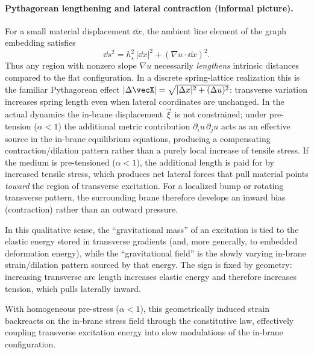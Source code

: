 \paragraph{Pythagorean lengthening and lateral contraction (informal picture).}
For a small material displacement $\dd x$, the ambient line element of the graph embedding satisfies
\begin{equation}
  \dd s^2 = h_\star^2\,|\dd x|^2 + (\nabla u\cdot \dd x)^2.
  \label{eq:line-element-graph}
\end{equation}
Thus any region with nonzero slope $\nabla u$ necessarily \emph{lengthens} intrinsic distances compared to the flat
configuration.
In a discrete spring-lattice realization this is the familiar Pythagorean effect
$|\Delta \vecX|=\sqrt{|\Delta x|^2+(\Delta u)^2}$: transverse variation increases spring length even when lateral
coordinates are unchanged.
In the actual dynamics the in-brane displacement $\vec\xi$ is not constrained; under pre-tension ($\alpha<1$) the
additional metric contribution $\partial_i u\,\partial_j u$ acts as an effective source in the in-brane equilibrium
equations, producing a compensating contraction/dilation pattern rather than a purely local increase of tensile stress.
If the medium is pre-tensioned ($\alpha<1$), the additional length is paid for by increased tensile stress,
which produces net lateral forces that pull material points \emph{toward} the region of transverse excitation.
For a localized bump or rotating transverse pattern, the surrounding brane therefore develops an inward bias
(contraction) rather than an outward pressure.

In this qualitative sense, the ``gravitational mass'' of an excitation is tied to the elastic energy stored in
transverse gradients (and, more generally, to embedded deformation energy), while the ``gravitational field'' is the
slowly varying in-brane strain/dilation pattern sourced by that energy.
The sign is fixed by geometry: increasing transverse arc length increases elastic energy and therefore increases
tension, which pulls laterally inward.

With homogeneous pre-stress ($\alpha<1$), this geometrically induced strain backreacts on the in-brane stress field
through the constitutive law, effectively coupling transverse excitation energy into slow modulations of the
in-brane configuration.

